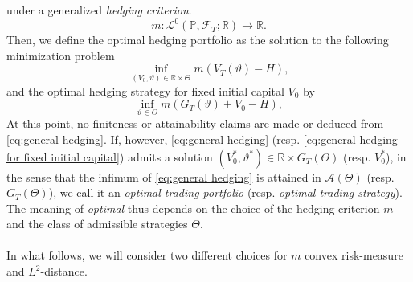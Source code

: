 \documentclass[11pt,a4paper,twoside,openany]{report}
\theoremstyle{plain} %
\theoremstyle{definition} %
\theoremstyle{remark} %
\begin{document}
under a generalized \textit{hedging criterion}.
\begin{equation}
    m:\mathcal{L}^0(\mathbb{P},\mathcal{F}_T;\mathbb{R})\to\mathbb{R}.
\end{equation}
Then, we define the optimal hedging portfolio as the solution to the following minimization problem
\begin{equation}\label{eq:general hedging}
    \inf_{(V_0,\vartheta)\in\mathbb{R}\times\Theta}m(V_T(\vartheta)-H),
\end{equation}
and the optimal hedging strategy for fixed initial capital \(V_0\) by 
\begin{equation}\label{eq:general hedging for fixed initial capital}
    \inf_{\vartheta\in \Theta}m(G_T(\vartheta)+V_0-H),
\end{equation}
At this point, no finiteness or attainability claims are made or deduced from \cref{eq:general hedging}. If, however, \cref{eq:general hedging} (resp. \cref{eq:general hedging for fixed initial capital}) admits a solution \((V_0^*,\vartheta^*)\in\mathbb{R}\times G_T(\Theta)\) (resp. \(V_0^*\)), in the sense that the infimum of \cref{eq:general hedging} is attained in \(\mathcal{A}(\Theta)\) (resp. \(G_T(\Theta)\)), we call it an \textit{optimal trading portfolio} (resp. \textit{optimal trading strategy}). The meaning of \textit{optimal} thus depends on the choice of the hedging criterion \(m\) and the class of admissible strategies \(\Theta\). 
\\\\
In what follows, we will consider two different choices for \(m\) convex risk-measure and \(L^2\)-distance.
\end{document}
